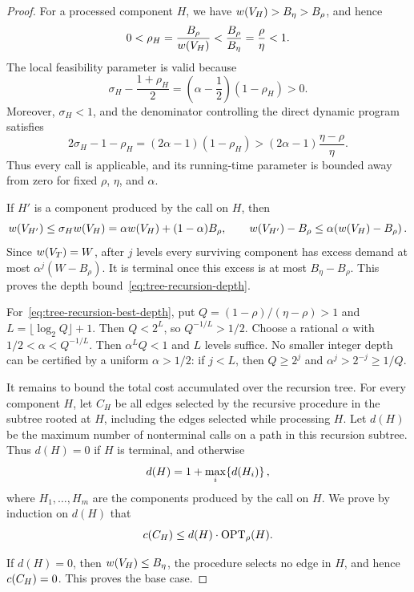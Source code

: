 \begin{proof}
    For a processed component $H$, we have $w\mathopen{}\left( V_H \right)>B_\eta>B_\rho$, and hence
    \[
        0<\rho_H=\frac{B_\rho}{w\mathopen{}\left( V_H \right)}<\frac{B_\rho}{B_\eta}=\frac{\rho}{\eta}<1.
    \]
    The local feasibility parameter is valid because
    \[
        \sigma_H-\frac{1+\rho_H}{2}
        =\left(\alpha-\frac12\right)(1-\rho_H)>0.
    \]
    Moreover, $\sigma_H<1$, and the denominator controlling the direct dynamic program satisfies
    \[
        2\sigma_H-1-\rho_H
        =(2\alpha-1)(1-\rho_H)
        >(2\alpha-1)\frac{\eta-\rho}{\eta}.
    \]
    Thus every call is applicable, and its running-time parameter is bounded away from zero for fixed $\rho$, $\eta$, and $\alpha$.

    If $H'$ is a component produced by the call on $H$, then
    \[
        w\mathopen{}\left( V_{H'} \right)
        \leq\sigma_H w\mathopen{}\left( V_H \right)
        =\alpha w\mathopen{}\left( V_H \right)+(1-\alpha)B_\rho,
        \qquad
        w\mathopen{}\left( V_{H'} \right)-B_\rho\leq\alpha\mathopen{}\left( w\mathopen{}\left( V_H \right)-B_\rho \right).
    \]
    Since $w\mathopen{}\left( V_T \right)=W$, after $j$ levels every surviving component has excess demand at most $\alpha^j(W-B_\rho)$. It is terminal once this excess is at most $B_\eta-B_\rho$. This proves the depth bound~\eqref{eq:tree-recursion-depth}.

    For~\eqref{eq:tree-recursion-best-depth}, put $Q=(1-\rho)/(\eta-\rho)>1$ and $L=\lfloor\log_2 Q\rfloor+1$. Then $Q<2^L$, so $Q^{-1/L}>1/2$. Choose a rational $\alpha$ with $1/2<\alpha<Q^{-1/L}$. Then $\alpha^LQ<1$ and $L$ levels suffice. No smaller integer depth can be certified by a uniform $\alpha>1/2$: if $j<L$, then $Q\geq2^j$ and $\alpha^j>2^{-j}\geq1/Q$.

    It remains to bound the total cost accumulated over the recursion tree. For every component $H$, let $C_H$ be all edges selected by the recursive procedure in the subtree rooted at $H$, including the edges selected while processing $H$. Let $d(H)$ be the maximum number of nonterminal calls on a path in this recursion subtree. Thus $d(H)=0$ if $H$ is terminal, and otherwise
    \[
        d(H)=1+\max_i\mathopen{}\left\{ d(H_i) \right\},
    \]
    where $H_1,\ldots,H_m$ are the components produced by the call on $H$. We prove by induction on $d(H)$ that
    \begin{equation}\label{eq:tree-recursion-inductive-cost}
        c\mathopen{}\left( C_H \right)\leq d(H)\cdot\textup{OPT}_{\rho}(H).
    \end{equation}

    If $d(H)=0$, then $w\mathopen{}\left( V_H \right)\leq B_\eta$, the procedure selects no edge in $H$, and hence $c\mathopen{}\left( C_H \right)=0$. This proves the base case.


\end{proof}
